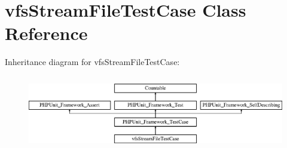\hypertarget{classorg_1_1bovigo_1_1vfs_1_1vfs_stream_file_test_case}{}\section{vfs\+Stream\+File\+Test\+Case Class Reference}
\label{classorg_1_1bovigo_1_1vfs_1_1vfs_stream_file_test_case}
Inheritance diagram for vfs\+Stream\+File\+Test\+Case\+:\begin{figure}[H]
\begin{center}
\leavevmode
\includegraphics[height=3.303835cm]{classorg_1_1bovigo_1_1vfs_1_1vfs_stream_file_test_case}
\end{center}
\end{figure}
